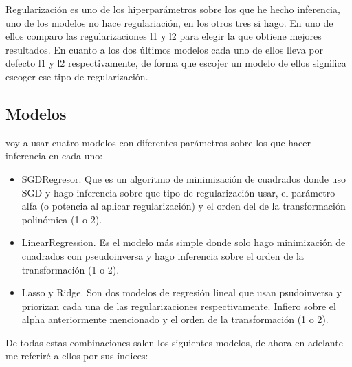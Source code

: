 \documentclass[a4paper,11pt]{article}
\begin{document}
Regularización es uno de los hiperparámetros sobre los que he hecho inferencia, uno de los modelos no hace regulariación, en los otros tres si hago. En uno de ellos comparo las regularizaciones l1 y l2 para elegir la que obtiene mejores resultados. En cuanto a los dos últimos modelos cada uno de ellos lleva por defecto l1 y l2 respectivamente, de forma que escojer un modelo de ellos significa escoger ese tipo de regularización.

\subsection{Modelos}

voy a usar cuatro modelos con diferentes parámetros sobre los que hacer inferencia en cada uno:

\begin{itemize}
\item SGDRegresor. Que es un algoritmo de minimización de cuadrados donde uso SGD y hago inferencia sobre que tipo de regularización usar, el parámetro alfa (o potencia al aplicar regularización) y el orden del de la transformación polinómica (1 o 2).
\item LinearRegression. Es el modelo más simple donde solo hago minimización de cuadrados con pseudoinversa y hago inferencia sobre el orden de la transformación (1 o 2).
\item Lasso y Ridge. Son dos modelos de regresión lineal que usan psudoinversa y priorizan cada una de las regularizaciones respectivamente. Infiero sobre el alpha anteriormente mencionado y el orden de la transformación (1 o 2).
\end{itemize}

De todas estas combinaciones salen los siguientes modelos, de ahora en adelante me referiré a ellos por sus índices:
\end{document}
